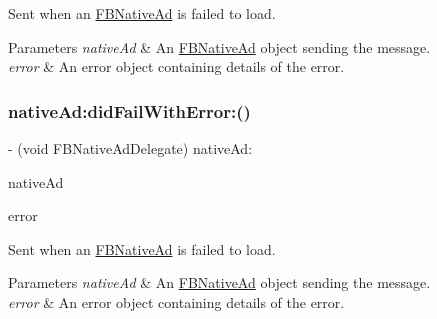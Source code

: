 Sent when an \hyperlink{interfaceFBNativeAd}{F\+B\+Native\+Ad} is failed to load.


\begin{DoxyParams}{Parameters}
{\em native\+Ad} & An \hyperlink{interfaceFBNativeAd}{F\+B\+Native\+Ad} object sending the message. \\
\hline
{\em error} & An error object containing details of the error. \\
\hline
\end{DoxyParams}
\mbox{\label{protocolFBNativeAdDelegate_01-p_a310f7227d74f4223c64e2543ab346304}} 
\subsubsection{\texorpdfstring{native\+Ad\+:did\+Fail\+With\+Error\+:()}{nativeAd:didFailWithError:()}\hspace{0.1cm}{\footnotesize\ttfamily [2/5]}}
{\footnotesize\ttfamily -\/ (void F\+B\+Native\+Ad\+Delegate) native\+Ad\+: \begin{DoxyParamCaption}\item[{(\hyperlink{interfaceFBNativeAd}{F\+B\+Native\+Ad} $\ast$)}]{native\+Ad }\item[{didFailWithError:(N\+S\+Error $\ast$)}]{error }\end{DoxyParamCaption}}

Sent when an \hyperlink{interfaceFBNativeAd}{F\+B\+Native\+Ad} is failed to load.


\begin{DoxyParams}{Parameters}
{\em native\+Ad} & An \hyperlink{interfaceFBNativeAd}{F\+B\+Native\+Ad} object sending the message. \\
\hline
{\em error} & An error object containing details of the error. \\
\hline
\end{DoxyParams}
\mbox{\label{protocolFBNativeAdDelegate_01-p_a310f7227d74f4223c64e2543ab346304}} 

